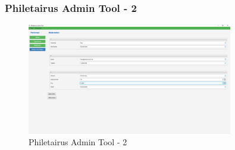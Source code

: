 \begin{frame}
\frametitle{Philetairus Admin Tool - 2}

\begin{figure}
  \includegraphics[width=0.8\textwidth]{figures/erfassung.png}
  \caption{Philetairus Admin Tool - 2}
  \label{fig:phileadmin2}
\end{figure}

\end{frame}




